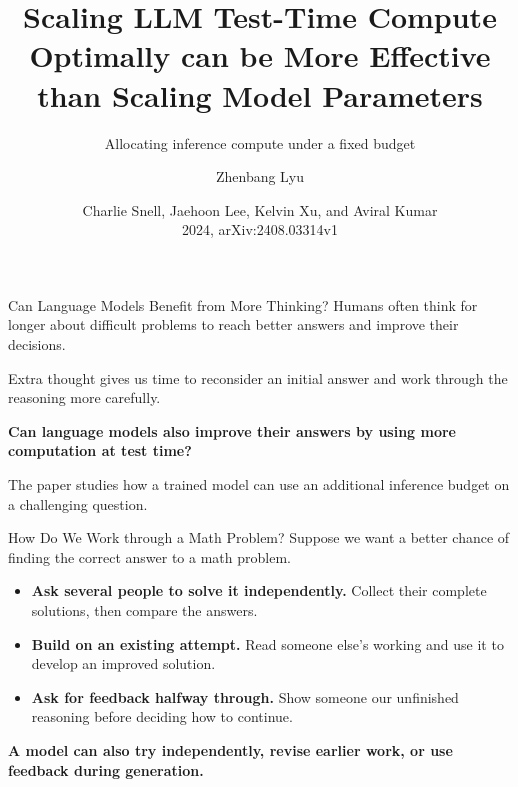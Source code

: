 \documentclass[aspectratio=1610,xcolor=dvipsnames,t]{beamer}
\title[Test-Time Compute in LLMs]{Scaling LLM Test-Time Compute Optimally can be More Effective than Scaling Model Parameters}
\subtitle{Allocating inference compute under a fixed budget}
\author[Zhenbang Lyu]{Zhenbang Lyu}
\institute[Uni HD]{Heidelberg University\\Institute of Computer Science}
\date[]{Charlie Snell, Jaehoon Lee, Kelvin Xu, and Aviral Kumar\\2024, arXiv:2408.03314v1}
\newcommand{\keyterm}[1]{\textcolor{unirot}{\textbf{#1}}}
\begin{document}
\begin{frame}[plain]
  \titlepage
\end{frame}

\begin{frame}{Can Language Models Benefit from More Thinking?}
  Humans often think for longer about difficult problems to reach better answers and improve their decisions.
  \par\medskip
  Extra thought gives us time to reconsider an initial answer and work through the reasoning more carefully.
  \par\medskip
  \keyterm{Can language models also improve their answers by using more computation at test time?}
  \par\medskip
  The paper studies how a trained model can use an additional inference budget on a challenging question.
\end{frame}

\begin{frame}{How Do We Work through a Math Problem?}
  Suppose we want a better chance of finding the correct answer to a math problem.
  \par\medskip
  \begin{itemize}
    \item \textbf{Ask several people to solve it independently.} Collect their complete solutions, then compare the answers.
    \par\smallskip
    \item \textbf{Build on an existing attempt.} Read someone else's working and use it to develop an improved solution.
    \par\smallskip
    \item \textbf{Ask for feedback halfway through.} Show someone our unfinished reasoning before deciding how to continue.
  \end{itemize}
  \par\medskip
  \keyterm{A model can also try independently, revise earlier work, or use feedback during generation.}
\end{frame}
\end{document}

